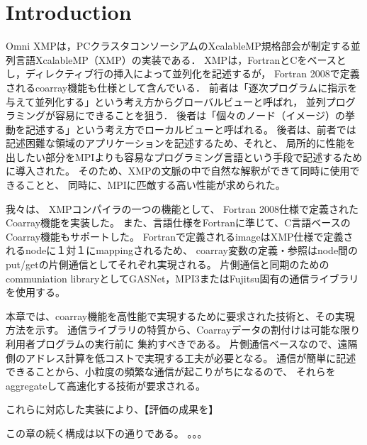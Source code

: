 \section{Introduction}\label{chap:intro}

\setcounter{page}{1}


Omni XMPは，PCクラスタコンソーシアムのXcalableMP規格部会が制定する並列言語XcalableMP（XMP）の実装である．
XMPは，FortranとCをベースとし，ディレクティブ行の挿入によって並列化を記述するが，
Fortran 2008で定義されるcoarray機能も仕様として含んでいる．
前者は「逐次プログラムに指示を与えて並列化する」という考え方からグローバルビューと呼ばれ，
並列プログラミングが容易にできることを狙う．
後者は「個々のノード（イメージ）の挙動を記述する」という考え方でローカルビューと呼ばれる。
後者は、前者では記述困難な領域のアプリケーションを記述するため、それと、
局所的に性能を出したい部分をMPIよりも容易なプログラミング言語という手段で記述するために導入された。
そのため、XMPの文脈の中で自然な解釈ができて同時に使用できることと、
同時に、MPIに匹敵する高い性能が求められた。

我々は、
XMPコンパイラの一つの機能として、
Fortran 2008仕様で定義されたCoarray機能を実装した。
また、言語仕様をFortranに準じて、C言語ベースのCoarray機能もサポートした。
Fortranで定義されるimageはXMP仕様で定義されるnodeに１対１にmappingされるため、
coarray変数の定義・参照はnode間のput/getの片側通信としてそれぞれ実現される。
片側通信と同期のためのcommuniation libraryとしてGASNet，MPI3またはFujitsu固有の通信ライブラリを使用する。

本章では、coarray機能を高性能で実現するために要求された技術と、その実現方法を示す。
通信ライブラリの特質から、Coarrayデータの割付けは可能な限り利用者プログラムの実行前に
集約すべきである。
片側通信ベースなので、遠隔側のアドレス計算を低コストで実現する工夫が必要となる。
通信が簡単に記述できることから、小粒度の頻繁な通信が起こりがちになるので、
それらをaggregateして高速化する技術が要求される。

これらに対応した実装により、【評価の成果を】


この章の続く構成は以下の通りである。
。。。
